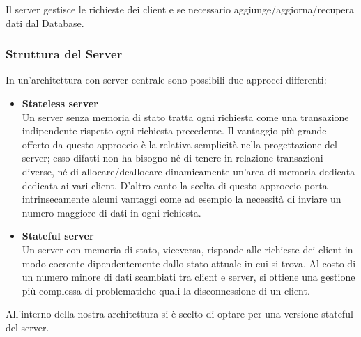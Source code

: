 \noindent Il server gestisce le richieste dei client e se necessario aggiunge/aggiorna/recupera dati dal Database.

\subsubsection{Struttura del Server}
In un'architettura con server centrale sono possibili due approcci differenti:
\begin{itemize}
    \item {\textbf{Stateless server}}\\
    Un server senza memoria di stato tratta ogni richiesta come una transazione indipendente rispetto ogni richiesta precedente.\newline
    Il vantaggio più grande offerto da questo approccio è la relativa semplicità nella progettazione del server; esso difatti non ha bisogno né di tenere in relazione transazioni diverse, né di allocare/deallocare dinamicamente un'area di memoria dedicata dedicata ai vari client.\newline
    D'altro canto la scelta di questo approccio porta intrinsecamente alcuni vantaggi come ad esempio la necessità di inviare un numero maggiore di dati in ogni richiesta.
    \item {\textbf{Stateful server}}\\
    Un server con memoria di stato, viceversa, risponde alle richieste dei client in modo coerente dipendentemente dallo stato attuale in cui si trova.\newline
    Al costo di un numero minore di dati scambiati tra client e server, si ottiene una gestione più complessa di problematiche quali la disconnessione di un client.
\end{itemize}
All'interno della nostra architettura si è scelto di optare per una versione stateful del server.

